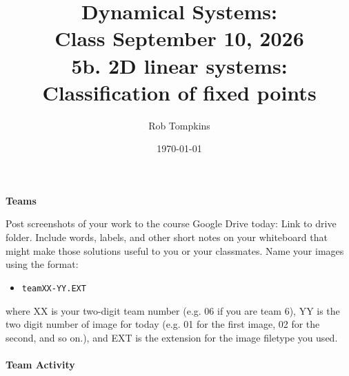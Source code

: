 \documentclass[12pt]{amsart}
\title{Dynamical Systems:\\Class September 10, 2026\\ 5b. 2D linear systems: Classification of fixed points}
\author{Rob Tompkins}
\date{\today}
\theoremstyle{conjecture}
\theoremstyle{definition}
\theoremstyle{question}
\theoremstyle{theorem}
\begin{document}
    \maketitle
    {\large\bfseries Teams}

    Post screenshots of your work to the course Google Drive today: Link to drive folder. Include words, labels, and other short notes on your whiteboard that might make those solutions useful to you or your classmates. Name your images using the format:
    \begin{itemize}\item \texttt{teamXX-YY.EXT}\end{itemize}
    where XX is your two-digit team number (e.g. 06 if you are team 6), YY is the two digit number of image for today (e.g. 01 for the first image, 02 for the second, and so on.), and EXT is the extension for the image filetype you used.
    \qquad\\
    \qquad\\
    {\large\bfseries Team Activity}
\end{document}
